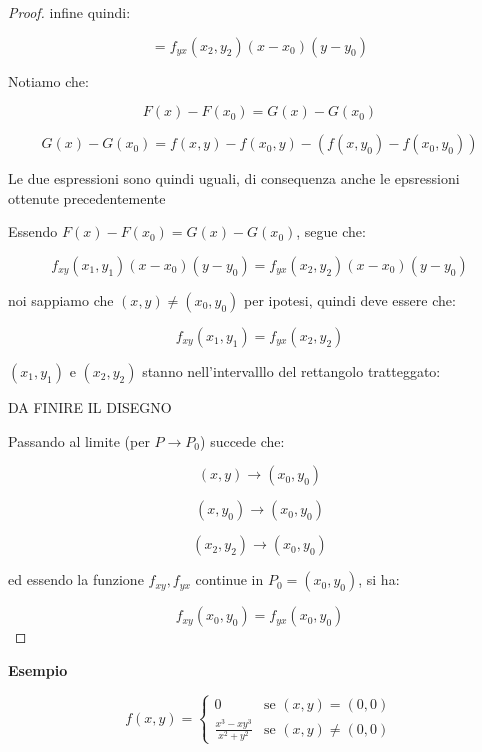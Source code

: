 \documentclass[../appunti-analisi.tex]{subfiles}
\begin{document}
\begin{proof}
       infine quindi:

       \[
           = f_{yx}(x_2,y_2)(x-x_0)(y-y_0)
       \]


       Notiamo che:

       \[
           F(x) - F(x_0) = G(x) -G(x_0)
       \]

       \[
           G(x) - G(x_0) = f(x,y) - f(x_0,y) - (f(x,y_0) -f(x_0,y_0))
       \] 

       Le due espressioni sono quindi uguali, di consequenza anche le epsressioni ottenute precedentemente

       Essendo $F(x) - F(x_0) = G(x) - G(x_0)$, segue che:

       \[
           f_{xy}(x_1,y_1)(x-x_0)(y-y_0) = f_{yx}(x_2,y_2)(x-x_0)(y-y_0)
       \]

       noi sappiamo che $(x,y) \neq (x_0,y_0)$ per ipotesi, quindi deve essere che:

       \[
           f_{xy}(x_1,y_1) = f_{yx}(x_2,y_2)
       \]

       $(x_1,y_1)$ e $(x_2,y_2)$ stanno nell'intervalllo del rettangolo tratteggato:

       DA FINIRE IL DISEGNO


       Passando al limite (per $P \rightarrow P_0$) succede che:

       \[
           (x,y) \rightarrow (x_0,y_0)
       \]

       \[
           (x,y_0) \rightarrow (x_0,y_0)
       \]

       \[
           (x_2,y_2) \rightarrow (x_0,y_0)
       \]

       ed essendo la funzione $f_{xy},f_{yx}$ continue in $P_0=(x_0,y_0)$, si ha:

       \[
           f_{xy}(x_0,y_0) = f_{yx}(x_0,y_0)
       \]


\end{proof}


\textbf{Esempio} 

\[
f(x,y)=\begin{cases}
    0 & \text{se $(x,y) = (0,0)$} \\
    \frac{x^{3}-xy^{3}}{x^{2}+y^{2}} & \text{se $(x,y) \neq (0,0)$}
\end{cases}
\]
\end{document}

